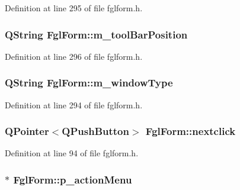 Definition at line 295 of file fglform.h.

\hypertarget{classFglForm_a0008c6a1c3362095ebd5ab0601910003}{
\subsubsection[{m\_\-toolBarPosition}]{\setlength{\rightskip}{0pt plus 5cm}QString {\bf FglForm::m\_\-toolBarPosition}}}
\label{classFglForm_a0008c6a1c3362095ebd5ab0601910003}


Definition at line 296 of file fglform.h.

\hypertarget{classFglForm_aff3b675ee7063af63839e029f66b4075}{
\subsubsection[{m\_\-windowType}]{\setlength{\rightskip}{0pt plus 5cm}QString {\bf FglForm::m\_\-windowType}}}
\label{classFglForm_aff3b675ee7063af63839e029f66b4075}


Definition at line 294 of file fglform.h.

\hypertarget{classFglForm_a17945f68955698f41dac6b11cf73cd07}{
\subsubsection[{nextclick}]{\setlength{\rightskip}{0pt plus 5cm}QPointer$<$QPushButton$>$ {\bf FglForm::nextclick}}}
\label{classFglForm_a17945f68955698f41dac6b11cf73cd07}


Definition at line 94 of file fglform.h.

\hypertarget{classFglForm_aace1d4f7b637af4d3aa86e53a770152e}{
\subsubsection[{p\_\-actionMenu}]{$\ast$ {\bf FglForm::p\_\-actionMenu}}}
\label{classFglForm_aace1d4f7b637af4d3aa86e53a770152e}


